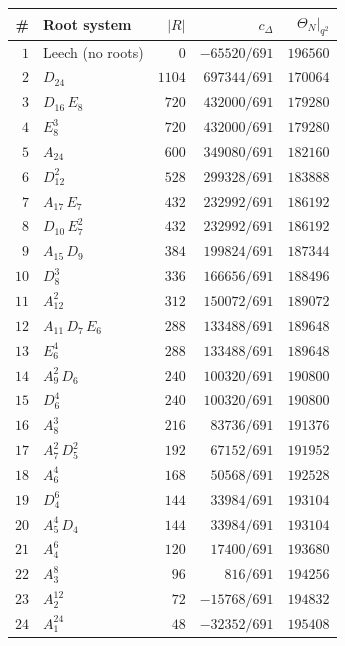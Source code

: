 \begin{center}
\small
\renewcommand{\arraystretch}{1.2}
\begin{tabular}{rlrrr}
\toprule
\# & \textbf{Root system} & $|R|$ & $c_\Delta$ & $\Theta_N|_{q^2}$ \\
\midrule
$1$ & Leech (no roots) & $0$ & $-65520/691$ & $196560$ \\
$2$ & $D_{24}$ & $1104$ & $697344/691$ & $170064$ \\
$3$ & $D_{16}\,E_8$ & $720$ & $432000/691$ & $179280$ \\
$4$ & $E_8^3$ & $720$ & $432000/691$ & $179280$ \\
$5$ & $A_{24}$ & $600$ & $349080/691$ & $182160$ \\
$6$ & $D_{12}^2$ & $528$ & $299328/691$ & $183888$ \\
$7$ & $A_{17}\,E_7$ & $432$ & $232992/691$ & $186192$ \\
$8$ & $D_{10}\,E_7^2$ & $432$ & $232992/691$ & $186192$ \\
$9$ & $A_{15}\,D_9$ & $384$ & $199824/691$ & $187344$ \\
$10$ & $D_8^3$ & $336$ & $166656/691$ & $188496$ \\
$11$ & $A_{12}^2$ & $312$ & $150072/691$ & $189072$ \\
$12$ & $A_{11}\,D_7\,E_6$ & $288$ & $133488/691$ & $189648$ \\
$13$ & $E_6^4$ & $288$ & $133488/691$ & $189648$ \\
$14$ & $A_9^2\,D_6$ & $240$ & $100320/691$ & $190800$ \\
$15$ & $D_6^4$ & $240$ & $100320/691$ & $190800$ \\
$16$ & $A_8^3$ & $216$ & $83736/691$ & $191376$ \\
$17$ & $A_7^2\,D_5^2$ & $192$ & $67152/691$ & $191952$ \\
$18$ & $A_6^4$ & $168$ & $50568/691$ & $192528$ \\
$19$ & $D_4^6$ & $144$ & $33984/691$ & $193104$ \\
$20$ & $A_5^4\,D_4$ & $144$ & $33984/691$ & $193104$ \\
$21$ & $A_4^6$ & $120$ & $17400/691$ & $193680$ \\
$22$ & $A_3^8$ & $96$ & $816/691$ & $194256$ \\
$23$ & $A_2^{12}$ & $72$ & $-15768/691$ & $194832$ \\
$24$ & $A_1^{24}$ & $48$ & $-32352/691$ & $195408$ \\
\bottomrule
\end{tabular}
\end{center}


